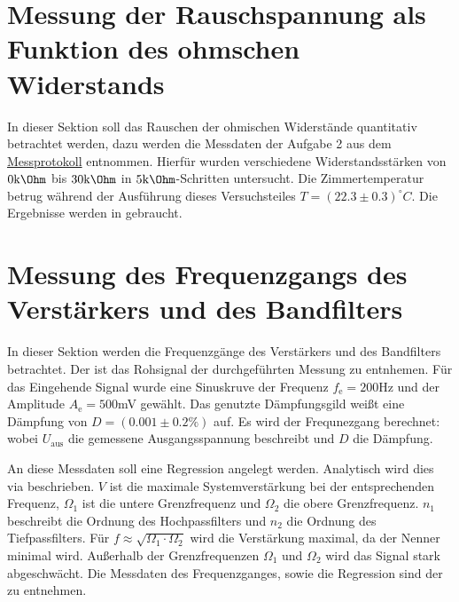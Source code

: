 \section{Messung der Rauschspannung als Funktion des ohmschen Widerstands}
\label{sec:A2}
In dieser Sektion soll das Rauschen der ohmischen Widerstände quantitativ betrachtet werden, dazu werden die Messdaten der Aufgabe 2 aus dem \hyperref[ch:Protokoll]{Messprotokoll} entnommen.
Hierfür wurden verschiedene Widerstandsstärken von $0\mathrm{k\Ohm}$  bis $30\mathrm{k\Ohm}$ in $5\mathrm{k\Ohm}$-Schritten untersucht. Die Zimmertemperatur betrug während der Ausführung dieses Versuchsteiles $T = (22.3 \pm 0.3)^\circ C$.
Die Ergebnisse werden in  gebraucht. 


\section{Messung des Frequenzgangs des Verstärkers und des Bandfilters}
\label{sec:A3}
In dieser Sektion werden die Frequenzgänge des Verstärkers und des Bandfilters betrachtet.
Der  ist das Rohsignal der durchgeführten Messung zu entnhemen. 
Für das Eingehende Signal wurde eine Sinuskruve der Frequenz $f_\text{e} = 200$Hz und der Amplitude $A_\text{e} = 500$mV gewählt. Das genutzte Dämpfungsgild weißt eine Dämpfung von $D = (0.001 \pm 0.2\%)$ auf.
Es wird der Frequnezgang berechnet:
wobei $U_\text{aus}$ die gemessene Ausgangsspannung beschreibt und $D$ die Dämpfung. 

An diese Messdaten soll eine Regression angelegt werden. Analytisch wird dies via
beschrieben. 
$V$ ist die maximale Systemverstärkung bei der entsprechenden Frequenz, $\Omega_1$ ist die untere Grenzfrequenz und $\Omega_2$ die obere Grenzfrequenz. $n_1$ beschreibt die Ordnung des Hochpassfilters und $n_2$ die Ordnung des Tiefpassfilters. Für $f \approx \sqrt{\Omega_1 \cdot \Omega_2}$ wird die Verstärkung maximal, da der Nenner minimal wird. Außerhalb der Grenzfrequenzen $\Omega_1$ und $\Omega_2$ wird das Signal stark abgeschwächt.
Die Messdaten des Frequenzganges, sowie die Regression sind der  zu entnehmen.

